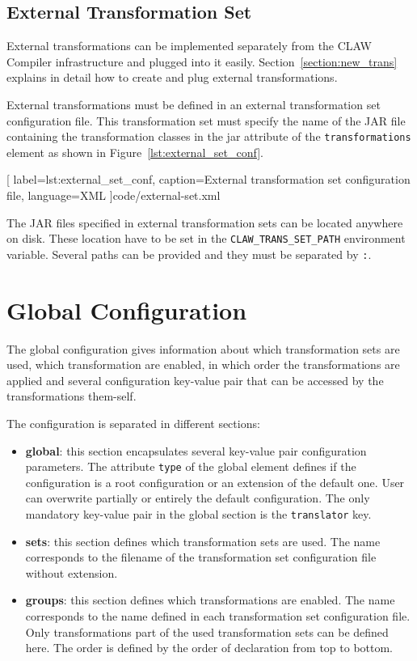 \subsection{External Transformation Set}
External transformations can be implemented separately from the CLAW Compiler
infrastructure and plugged into it easily. Section~\ref{section:new_trans} 
explains in detail how to create and plug external transformations. 

External transformations must be defined in an external transformation set 
configuration file. This transformation set must specify the
name of the JAR file containing the transformation classes in the jar attribute
of the \lstinline|transformations| element as shown in 
Figure~\ref{lst:external_set_conf}.


  [
    label=lst:external_set_conf,
    caption=External transformation set configuration file,
    language=XML
  ]{code/external-set.xml}

The JAR files specified in external transformation sets can be located anywhere
on disk. These location have to be set in the \lstinline!CLAW_TRANS_SET_PATH!
environment variable.
Several paths can be provided and they must be separated by \lstinline!:!.


\section{\clawfcomp Global Configuration}
The global configuration gives information about which transformation sets are
used, which transformation are enabled, in which order the transformations are
applied and several configuration key-value pair that can be accessed by the 
transformations them-self. 

The configuration is separated in different sections: 
\begin{itemize}
\item \textbf{global}: this section encapsulates several key-value pair 
      configuration parameters. The attribute \lstinline!type! of the global
      element defines if the configuration is a root configuration or an 
      extension of the default one. User can overwrite partially or entirely
      the default configuration.
      The only mandatory key-value pair in the global section is the 
      \lstinline!translator! key.
\item \textbf{sets}: this section defines which transformation sets are used.
      The name corresponds to the filename of the transformation set 
      configuration file without extension.
\item \textbf{groups}: this section defines which transformations are enabled.
      The name corresponds to the name defined in each transformation set 
      configuration file.
      Only transformations part of the used transformation sets can be defined
      here.
      The order is defined by the order of declaration from top to bottom.
\end{itemize}


